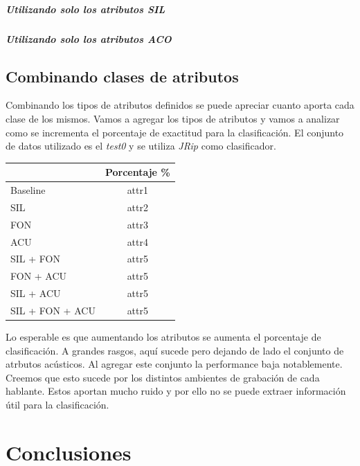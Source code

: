 \documentclass[11pt,a4paper,twoside]{tesis}
\begin{document}
\paragraph*{Utilizando solo los atributos SIL}
\paragraph*{Utilizando solo los atributos ACO}

\section{Combinando clases de atributos}

Combinando los tipos de atributos definidos se puede apreciar cuanto aporta cada clase de los mismos. Vamos a agregar los tipos de atributos y vamos a analizar como se incrementa el porcentaje de exactitud para la clasificación. El conjunto de datos utilizado es el \textit{test0} y se utiliza \textit{JRip} como clasificador.

\begin{table}[h]
\centering
\begin{tabular}{|l|c|}
\hline
\textbf{}  & \textbf{Porcentaje \%}  \\ \hline
Baseline & attr1\\ \hline
SIL & attr2\\ \hline
FON & attr3\\ \hline
ACU & attr4\\ \hline
SIL + FON & attr5\\ \hline
FON + ACU & attr5\\ \hline
SIL + ACU & attr5\\ \hline
SIL + FON + ACU & attr5\\ \hline
\end{tabular}
\end{table}

Lo esperable es que aumentando los atributos se aumenta el porcentaje de clasificación. A grandes rasgos, aquí sucede pero dejando de lado el conjunto de atrbutos acústicos. Al agregar este conjunto la performance baja notablemente. Creemos que esto sucede por los distintos ambientes de grabación de cada hablante. Estos aportan mucho ruido y por ello no se puede extraer información útil para la clasificación.

\chapter{Conclusiones}
\end{document}
